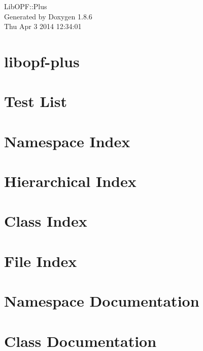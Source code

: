 \documentclass[twoside]{book}
\newcommand{\+}{\discretionary{\mbox{\scriptsize$\hookleftarrow$}}{}{}}
\newcommand{\clearemptydoublepage}{%
  \newpage{\pagestyle{empty}\cleardoublepage}%
}
\begin{document}
\hypersetup{pageanchor=false,
             bookmarks=true,
             bookmarksnumbered=true,
             pdfencoding=unicode
            }
\begin{titlepage}
\vspace*{7cm}
\begin{center}%
{\Large Lib\+O\+P\+F\+:\+:Plus }\\
\vspace*{1cm}
{\large Generated by Doxygen 1.8.6}\\
\vspace*{0.5cm}
{\small Thu Apr 3 2014 12:34:01}\\
\end{center}
\end{titlepage}
\clearemptydoublepage
\tableofcontents
\clearemptydoublepage
{}
\hypersetup{pageanchor=true}

\chapter{libopf-\/plus}
\label{md_README}
\hypertarget{md_README}{}

\chapter{Test List}
\label{test}
\hypertarget{test}{}

\chapter{Namespace Index}

\chapter{Hierarchical Index}

\chapter{Class Index}

\chapter{File Index}

\chapter{Namespace Documentation}

\chapter{Class Documentation}
















\end{document}
